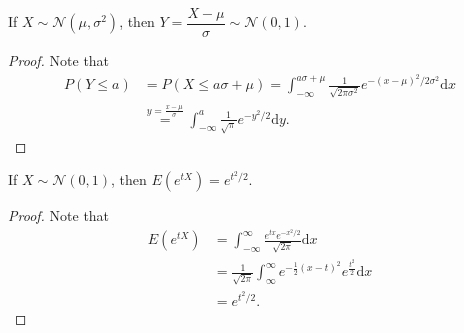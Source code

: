 \documentclass[11pt,singlecolumn, openany, citestyle=authoryear]{elegantbook}
\begin{document}
\begin{CJK}{UTF8}{gbsn}
\begin{proposition}
    If $X\sim \mathcal{N}(\mu,\sigma^2)$, then $Y=\dfrac{X-\mu}{\sigma}\sim\mathcal{N}(0,1)$.
\end{proposition}
\begin{proof}
    Note that 
    \begin{align*}
        P(Y\leqslant a) &= P(X\leqslant a\sigma + \mu)=
        \int_{-\infty}^{a\sigma+\mu}\frac{1}{\sqrt{2\pi\sigma^2}}e^{-(x-\mu)^2/2\sigma^2}\mathrm{d}x\\
        &\overset{y=\frac{x-\mu}{\sigma}}{=}
        \int_{-\infty}^{a}\frac{1}{\sqrt{\pi}}e^{-y^2/2}\mathrm{d}y.
    \end{align*}
\end{proof}
\begin{proposition}
    If $X\sim \mathcal{N}(0,1)$, then $E(e^{tX})=e^{t^2/2}$.
\end{proposition}
\begin{proof}
    Note that 
    \begin{align*}
        E(e^{tX})&=\int_{-\infty}^\infty \frac{e^{tx}e^{-x^2/2}}{\sqrt{2\pi}}\mathrm{d}x\\
        &=\frac{1}{\sqrt{2\pi}}\int_{\infty}^\infty e^{-\frac{1}{2}(x-t)^2}
        e^{\frac{t^2}{2}}\mathrm{d}x\\
        &=e^{t^2/2}.
    \end{align*}
\end{proof}


\end{CJK}
\end{document}
